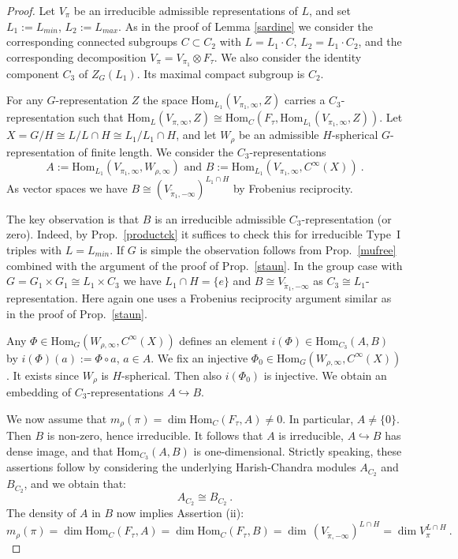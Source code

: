 \documentclass[10]{amsart}
\theoremstyle{remark}
\theoremstyle{definition}
\numberwithin{equation}{section}
\newcommand{\Hom}{\mathrm{Hom}}
\newcommand{\be}{\begin{equation}}
\begin{document}
{\begin{proof} Let $V_\pi$ be an irreducible admissible representations of $L$, and set $L_1:=L_{min}$, $L_2:=L_{max}$. As in the proof of Lemma \ref{sardine} we consider
the corresponding connected subgroups $C\subset C_2$ with $L=L_1 \cdot C$, $L_2=L_1 \cdot C_2$, and the corresponding decomposition  $V_\pi=V_{\pi_1}\otimes F_\tau$.
We also consider the identity component $C_3$ of $Z_G(L_1)$.
Its maximal compact subgroup is $C_2$.
  
 For any $G$-representation $Z$ the space $\Hom_{L_1}(V_{\pi_1,\infty},Z)$ carries a 
$C_3$-representation such that $\Hom_{L}(V_{\pi,\infty},Z)\cong \Hom_C(F_\tau, \Hom_{L_1}(V_{\pi_1,\infty},Z))$. Let $X=G/H\cong L/L\cap H\cong L_1/L_1\cap H$, and let $W_\rho$ be an admissible 
$H$-spherical $G$-representation of finite length. We consider the $C_3$-representations 
$$ A:= \Hom_{L_1}(V_{\pi_1,\infty},W_{\rho,\infty})\mbox{ and } B:=  \Hom_{L_1}(V_{\pi_1,\infty},C^\infty(X))\ .$$
As vector spaces we have $B\cong (V_{\tilde\pi_1,-\infty})^{L_1\cap H}$ by Frobenius reciprocity. 

The key observation is that $B$ is an irreducible admissible $C_3$-representation (or zero). Indeed, by Prop.~\ref{productck} it suffices to check this for irreducible Type~I triples with $L=L_{min}$.
If $G$ is simple the observation follows from Prop.~\ref{mufree} combined with the argument of the proof of Prop.~\ref{staun}. In the group case with $G=G_1\times G_1\cong L_1\times C_3$
we have $L_1\cap H=\{e\}$ and $B\cong V_{\tilde\pi_1,-\infty}$ as $C_3\cong L_1$-representation. Here again one uses a Frobenius reciprocity argument similar as in the proof of  Prop.~\ref{staun}.

Any $\Phi\in \Hom_G(W_{\rho,\infty}, C^\infty(X))$ defines an element $i(\Phi)\in \Hom_{C_3}(A,B)$ by $i(\Phi)(a):=\Phi\circ a$, $a\in A$.
We fix an injective $\Phi_0\in \Hom_G(W_{\rho,\infty}, C^\infty(X))$. It exists since $W_\rho$ is $H$-spherical. Then also $i(\Phi_0)$ is injective. We obtain an embedding of
$C_3$-representations 
$A\hookrightarrow B$. 

We now assume that $m_\rho(\pi)=\dim \Hom_C(F_\tau,A)\ne 0$. In particular, $A\ne\{0\}$. Then $B$ is non-zero, hence irreducible. It follows that $A$ is irreducible,
$A\hookrightarrow B$ has dense image, and that $\Hom_{C_3}(A,B)$ is one-dimensional.
Strictly speaking, these assertions follow by considering the underlying Harish-Chandra modules $A_{C_2}$ and $B_{C_2}$, and we obtain that:
\be\label{weird}A_{C_2}\cong B_{C_2}\  .\end{equation}
The density of $A$ in $B$ now implies Assertion (ii):
$$ m_\rho(\pi)=\dim \Hom_C(F_\tau,A)=\dim\Hom_C(F_\tau, B)=\dim\, (V_{\tilde\pi,-\infty})^{L\cap H}=\dim V_\pi^{L\cap H}\ .$$




\end{proof}}
\end{document}
